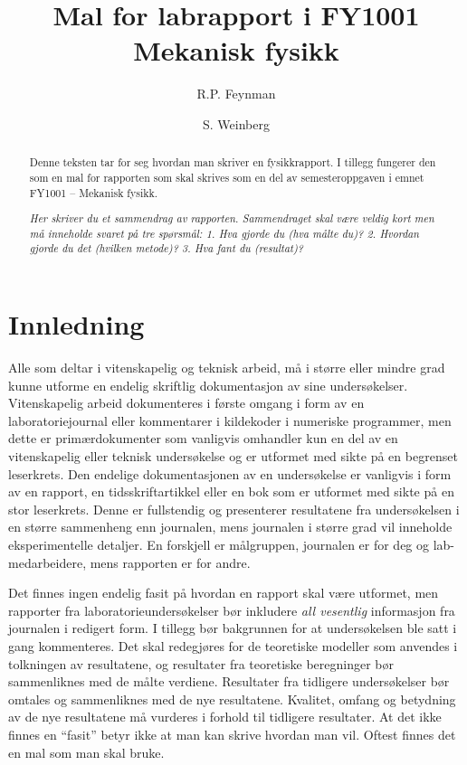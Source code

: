 \documentclass[5p]{elsarticle}
\title{Mal for labrapport i FY1001 Mekanisk fysikk}
\author[fysikk]{R.P. Feynman}
\author[fysikk]{S. Weinberg}
\begin{document}
\begin{abstract}
Denne teksten tar for seg hvordan man skriver en fysikkrapport. I tillegg fungerer
den som en mal for rapporten som skal skrives som en del av semesteroppgaven i emnet FY1001 – Mekanisk fysikk.

\textit{Her skriver du et sammendrag av rapporten. Sammendraget skal være veldig kort
men må inneholde svaret på tre spørsmål: 1. Hva gjorde du (hva målte du)? 2. Hvordan 
gjorde du det (hvilken metode)? 3. Hva fant du (resultat)?}
\end{abstract}

\maketitle %

\section{Innledning}
Alle som deltar i vitenskapelig og teknisk arbeid, må i større eller mindre
grad kunne utforme en endelig skriftlig dokumentasjon av sine undersøkelser. 
Vitenskapelig arbeid dokumenteres i første omgang i form av en
laboratoriejournal eller kommentarer i kildekoder i numeriske programmer,
men dette er primærdokumenter som vanligvis
omhandler kun en del av en vitenskapelig eller teknisk undersøkelse og
er utformet med sikte på en begrenset leserkrets. Den endelige
dokumentasjonen av en undersøkelse er vanligvis i form av en rapport, en
tidsskriftartikkel eller en bok som er utformet med sikte på en stor
leserkrets. Denne er fullstendig og presenterer resultatene fra
undersøkelsen i en større sammenheng enn journalen, mens journalen i
større grad vil inneholde eksperimentelle detaljer. En forskjell er målgruppen, journalen er for deg og lab-medarbeidere, mens rapporten er for andre.

Det finnes ingen endelig fasit på hvordan en rapport skal være utformet, men
rapporter fra laboratorie\-under\-søkelser bør inkludere \emph{all vesentlig} informasjon
fra journalen i redigert form. I tillegg bør bakgrunnen for at undersøkelsen ble
satt i gang kommenteres. Det skal redegjøres for de teoretiske modeller som anvendes
i tolkningen av resultatene, og resultater fra teoretiske beregninger bør sammenliknes 
med de målte verdiene. Resultater fra tidligere undersøkelser bør omtales og
sammenliknes med de nye resultatene. Kvalitet, omfang og betydning av de nye resultatene
må vurderes i forhold til tidligere resultater. 
At det ikke finnes en ``fasit'' betyr ikke at man kan skrive hvordan man vil. Oftest finnes det en mal som man skal bruke. 
\end{document}
